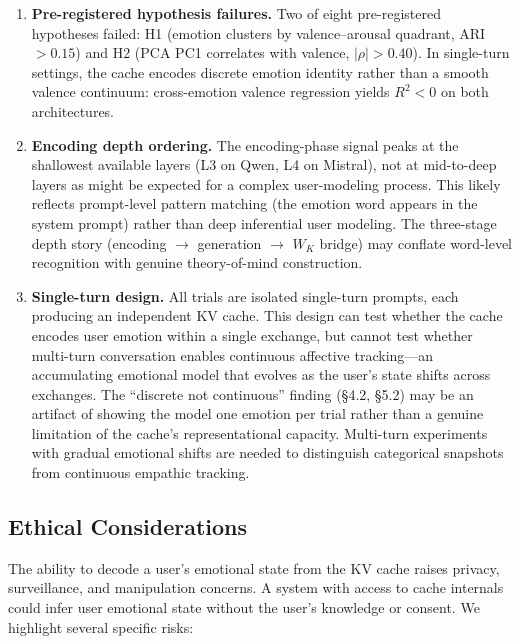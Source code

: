 \documentclass[11pt,a4paper]{article}
\begin{document}
\begin{enumerate}[nosep]
    \item \textbf{Pre-registered hypothesis failures.} Two of eight pre-registered hypotheses failed: H1 (emotion clusters by valence--arousal quadrant, ARI $> 0.15$) and H2 (PCA PC1 correlates with valence, $|\rho| > 0.40$). In single-turn settings, the cache encodes discrete emotion identity rather than a smooth valence continuum: cross-emotion valence regression yields $R^2 < 0$ on both architectures.

    \item \textbf{Encoding depth ordering.} The encoding-phase signal peaks at the shallowest available layers (L3 on Qwen, L4 on Mistral), not at mid-to-deep layers as might be expected for a complex user-modeling process. This likely reflects prompt-level pattern matching (the emotion word appears in the system prompt) rather than deep inferential user modeling. The three-stage depth story (encoding $\to$ generation $\to$ $W_K$ bridge) may conflate word-level recognition with genuine theory-of-mind construction.

    \item \textbf{Single-turn design.} All trials are isolated single-turn prompts, each producing an independent KV cache. This design can test whether the cache encodes user emotion within a single exchange, but cannot test whether multi-turn conversation enables continuous affective tracking---an accumulating emotional model that evolves as the user's state shifts across exchanges. The ``discrete not continuous'' finding (\S4.2, \S5.2) may be an artifact of showing the model one emotion per trial rather than a genuine limitation of the cache's representational capacity. Multi-turn experiments with gradual emotional shifts are needed to distinguish categorical snapshots from continuous empathic tracking.
\end{enumerate}

\subsection{Ethical Considerations}

The ability to decode a user's emotional state from the KV cache raises privacy, surveillance, and manipulation concerns. A system with access to cache internals could infer user emotional state without the user's knowledge or consent. We highlight several specific risks:
\end{document}
